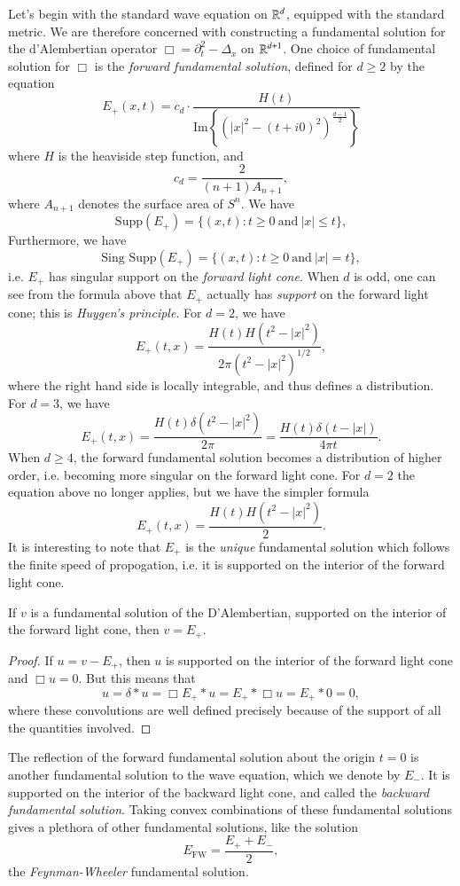 Let's begin with the standard wave equation on $\operatorname{\mathbb{R}}^d$, equipped with the standard metric. We are therefore concerned with constructing a fundamental solution for the d'Alembertian operator $\Box = \partial_t^2 - \Delta_x$ on $\operatorname{\mathbb{R}}^{d + 1}$. One choice of fundamental solution for $\Box$ is the \emph{forward fundamental solution}, defined for $d \geq 2$ by the equation
%
\[ E_+(x,t) = c_d \cdot \frac{H(t)}{\text{Im} \left\{ (|x|^2 - (t + i0)^2)^{\frac{d-1}{2}} \right\}} \]
%
where $H$ is the heaviside step function, and
%
\[ c_d = \frac{2}{(n+1) A_{n+1}}, \]
%
where $A_{n+1}$ denotes the surface area of $S^n$. We have
%
\[ \text{Supp}(E_+) = \{ (x,t): t \geq 0\ \text{and}\ |x| \leq t \}, \]
%
Furthermore, we have
%
\[ \text{Sing\ Supp}(E_+) = \{ (x,t): t \geq 0\ \text{and}\ |x| = t \}, \]
%
i.e. $E_+$ has singular support on the \emph{forward light cone}. When $d$ is odd, one can see from the formula above that $E_+$ actually has \emph{support} on the forward light cone; this is \emph{Huygen's principle}. For $d = 2$, we have
%
\[ E_+(t,x) = \frac{H(t) H(t^2 - |x|^2)}{2 \pi (t^2 - |x|^2)^{1/2}}, \]
%
where the right hand side is locally integrable, and thus defines a distribution. For $d = 3$, we have
%
\[ E_+(t,x) = \frac{H(t) \delta(t^2 - |x|^2)}{2 \pi} = \frac{H(t) \delta(t - |x|)}{4 \pi t}. \]
%
When $d \geq 4$, the forward fundamental solution becomes a distribution of higher order, i.e. becoming more singular on the forward light cone. For $d = 2$ the equation above no longer applies, but we have the simpler formula
%
\[ E_+(t,x) = \frac{H(t) H(t^2 - |x|^2)}{2}. \]
%
It is interesting to note that $E_+$ is the \emph{unique} fundamental solution which follows the finite speed of propogation, i.e. it is supported on the interior of the forward light cone.

\begin{lemma}
    If $v$ is a fundamental solution of the D'Alembertian, supported on the interior of the forward light cone, then $v = E_+$.
\end{lemma}
\begin{proof}
    If $u = v - E_+$, then $u$ is supported on the interior of the forward light cone and $\Box u = 0$. But this means that
    \[ u = \delta * u = \Box E_+ * u = E_+ * \Box u = E_+ * 0 = 0, \]
    where these convolutions are well defined precisely because of the support of all the quantities involved.
\end{proof}

The reflection of the forward fundamental solution about the origin $t = 0$ is another fundamental solution to the wave equation, which we denote by $E_-$. It is supported on the interior of the backward light cone, and called the \emph{backward fundamental solution}. Taking convex combinations of these fundamental solutions gives a plethora of other fundamental solutions, like the solution
%
\[ E_{\text{FW}} = \frac{E_+ + E_-}{2}, \]
%
the \emph{Feynman-Wheeler} fundamental solution.

